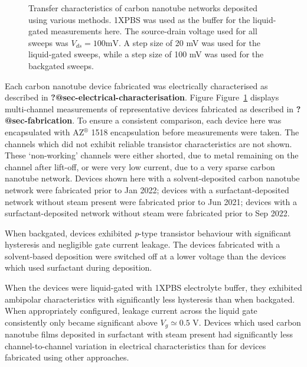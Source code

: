 \documentclass[
  a4paper,
]{scrbook}
\begin{document}
\begin{figure}
\begin{minipage}[t]{0.49\linewidth}
{{}

}

\end{minipage}%

\caption{\label{fig-pristine-cnt-characteristics}Transfer
characteristics of carbon nanotube networks deposited using various
methods. 1XPBS was used as the buffer for the liquid-gated measurements
here. The source-drain voltage used for all sweeps was
\(V_{ds} = 100 \textrm{mV}\). A step size of 20 mV was used for the
liquid-gated sweeps, while a step size of 100 mV was used for the
backgated sweeps.}

\end{figure}

Each carbon nanotube device fabricated was electrically characterised as
described in \textbf{?@sec-electrical-characterisation}. Figure
Figure~\ref{fig-pristine-cnt-characteristics} displays multi-channel
measurements of representative devices fabricated as described in
\textbf{?@sec-fabrication}. To ensure a consistent comparison, each
device here was encapsulated with AZ\(^\circledR\) 1518 encapsulation
before measurements were taken. The channels which did not exhibit
reliable transistor characteristics are not shown. These `non-working'
channels were either shorted, due to metal remaining on the channel
after lift-off, or were very low current, due to a very sparse carbon
nanotube network. Devices shown here with a solvent-deposited carbon
nanotube network were fabricated prior to Jan 2022; devices with a
surfactant-deposited network without steam present were fabricated prior
to Jun 2021; devices with a surfactant-deposited network without steam
were fabricated prior to Sep 2022.

When backgated, devices exhibited \emph{p}-type transistor behaviour
with significant hysteresis and negligible gate current leakage. The
devices fabricated with a solvent-based deposition were switched off at
a lower voltage than the devices which used surfactant during
deposition.

When the devices were liquid-gated with 1XPBS electrolyte buffer, they
exhibited ambipolar characteristics with significantly less hysteresis
than when backgated. When appropriately configured, leakage current
across the liquid gate consistently only became significant above
\(V_g \simeq 0.5\) V. Devices which used carbon nanotube films deposited
in surfactant with steam present had significantly less
channel-to-channel variation in electrical characteristics than for
devices fabricated using other approaches.
\end{document}

